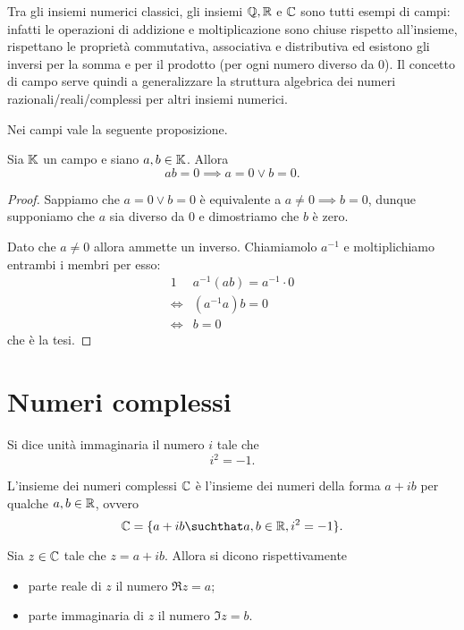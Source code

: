 Tra gli insiemi numerici classici, gli insiemi $\mathbb{Q}, \mathbb{R}$ e $\mathbb{C}$ sono tutti esempi di campi: infatti le operazioni di addizione e moltiplicazione sono chiuse rispetto all'insieme, rispettano le proprietà commutativa, associativa e distributiva ed esistono gli inversi per la somma e per il prodotto (per ogni numero diverso da $0$). Il concetto di campo serve quindi a generalizzare la struttura algebrica dei numeri razionali/reali/complessi per altri insiemi numerici.

Nei campi vale la seguente proposizione.
\begin{proposition}
     \label{annullamento_prodotto}
    Sia $\mathbb{K}$ un campo e siano $a, b \in \mathbb{K}$. Allora \[
        ab = 0 \implies a = 0 \lor b = 0.    
    \]
\end{proposition}
\begin{proof}
    Sappiamo che $a = 0 \lor b = 0$ è equivalente a $a \neq 0 \implies b = 0$, dunque supponiamo che $a$ sia diverso da $0$ e dimostriamo che $b$ è zero.

    Dato che $a \neq 0$ allora ammette un inverso. Chiamiamolo $a^{-1}$ e moltiplichiamo entrambi i membri per esso:
    \begin{alignat*}
        {1}
        &a^{-1}(ab) = a^{-1} \cdot 0\\
        \iff &(a^{-1}a)b = 0 \\
        \iff &b = 0
    \end{alignat*}
    che è la tesi.
\end{proof}

\section{Numeri complessi}

\begin{definition}
    Si dice unità immaginaria il numero $i$ tale che \[
        i^2 = -1.    
    \]
\end{definition}

\begin{definition}
    L'insieme dei numeri complessi $\mathbb{C}$ è l'insieme dei numeri della forma $a+ib$ per qualche $a, b \in \mathbb{R}$, ovvero \[
        \C = \{ a + ib \suchthat a, b \in \R, i^2 = -1\}.  
    \]
\end{definition}

\begin{definition}
    Sia $z \in \mathbb{C}$ tale che $z = a + ib$. Allora si dicono rispettivamente \begin{itemize}
        \item parte reale di $z$ il numero $\Re z = a$;
        \item parte immaginaria di $z$ il numero $\Im z = b$.
    \end{itemize}
\end{definition}

